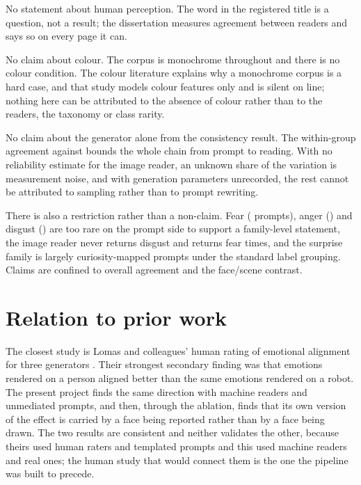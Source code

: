 No statement about human perception. The word in the registered title is a question, not a result; the dissertation measures agreement between readers and says so on every page it can.

No claim about colour. The corpus is monochrome throughout and there is no colour condition. The colour literature \cite{alvarado2025texttoimage} explains why a monochrome corpus is a hard case, and that study models colour features only and is silent on line; nothing here can be attributed to the absence of colour rather than to the readers, the taxonomy or class rarity.

No claim about the generator alone from the consistency result. The \ConsFam{} within-group agreement against \ConsFamNull{} bounds the whole chain from prompt to reading. With no reliability estimate for the image reader, an unknown share of the variation is measurement noise, and with generation parameters unrecorded, the rest cannot be attributed to sampling rather than to prompt rewriting.

There is also a restriction rather than a non-claim. Fear (\RecFearN{} prompts), anger (\RecAngerN{}) and disgust (\RecDisgustN{}) are too rare on the prompt side to support a family-level statement, the image reader never returns disgust and returns fear \famImageFear{} times, and the surprise family is largely curiosity-mapped prompts under the standard label grouping. Claims are confined to overall agreement and the face/scene contrast.

\section{Relation to prior work}
\label{sec:disc-prior}

The closest study is Lomas and colleagues' human rating of emotional alignment for three generators \cite{lomas2024improved}. Their strongest secondary finding was that emotions rendered on a person aligned better than the same emotions rendered on a robot. The present project finds the same direction with machine readers and unmediated prompts, and then, through the ablation, finds that its own version of the effect is carried by a face being reported rather than by a face being drawn. The two results are consistent and neither validates the other, because theirs used human raters and templated prompts and this used machine readers and real ones; the human study that would connect them is the one the pipeline was built to precede.

